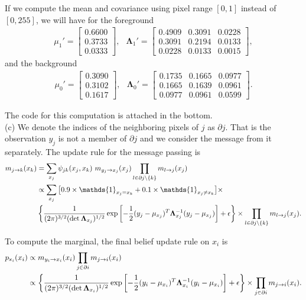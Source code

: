 \documentclass{article}
\newcommand{\s}[1]{\textsf{\textit{#1}}}
\begin{document}
If we compute the mean and covariance using pixel range $[0, 1]$ instead of $[0, 255]$, we will have for the foreground
\begin{align*}
	\mu_1' = 
	\begin{bmatrix}
    0.6600 \\
    0.3733 \\
    0.0333
\end{bmatrix}, \;\;\,
	\mathbf{\Lambda}_1' =
\begin{bmatrix}
 0.4909 & 0.3091 & 0.0228 \\
 0.3091 & 0.2194 & 0.0133 \\
 0.0228 & 0.0133 & 0.0015
\end{bmatrix},
\end{align*}
and the background
\begin{align*}
	\mu_0' = 
	\begin{bmatrix}
    0.3090 \\
    0.3102 \\
    0.1617
\end{bmatrix}, \;\;\,
	\mathbf{\Lambda}_0' =
\begin{bmatrix}
0.1735 & 0.1665 & 0.0977 \\
0.1665 & 0.1639 & 0.0961 \\
0.0977 & 0.0961 & 0.0599
\end{bmatrix}.
\end{align*}

The code for this computation is attached in the bottom.
\\

\noindent
(c)
We denote the indices of the neighboring pixels of $j$ as $\partial j$. That is the observation $y_j$ is not a member of $\partial j$ and we consider the message from it separately. The update rule for the message passing is
\begin{align*}
	m_{j\to k}(x_k) &= \sum_{x_j} \psi_{jk}(x_j, x_k)\,\,m_{y_j\to x_j}(x_j) \prod_{l\in\partial{j}\backslash\{k\}}m_{l\to j}(x_j)\\
	&\propto \sum_{x_j} \big[0.9\times\mathds{1}_{x_j = x_k} + 0.1\times\mathds{1}_{x_j \neq x_k} \big] \times\\
	& \left\{\frac{1}{(2\pi)^{3/2}(\det {\bf\Lambda}_{x_j})^{1/2}} \exp\left[-\frac{1}{2}(y_j-\mu_{x_j})^T\mathbf{\Lambda}^{-1}_{x_j}(y_j - \mu_{x_j})\right] + \epsilon\right\}
	\times \prod_{l\in\partial{j}\backslash\{k\}}m_{l\to j}(x_j).
\end{align*}
%

To compute the marginal, the final belief update rule on $x_i$ is
\begin{align*}
	p_{\s{x}_i}(x_i) &\propto  m_{y_i\to x_i}(x_i) \prod_{j\in\partial{i}}m_{j\to i}(x_i)\\
	&\propto \left\{\frac{1}{(2\pi)^{3/2}(\det {\bf\Lambda}_{x_i})^{1/2}} \exp\left[-\frac{1}{2}(y_i-\mu_{x_i})^T\mathbf{\Lambda}^{-1}_{x_i}(y_i - \mu_{x_i})\right] + \epsilon\right\}
	\times \prod_{j\in\partial{i}}m_{j\to i}(x_i).
\end{align*}
\\
\end{document}
